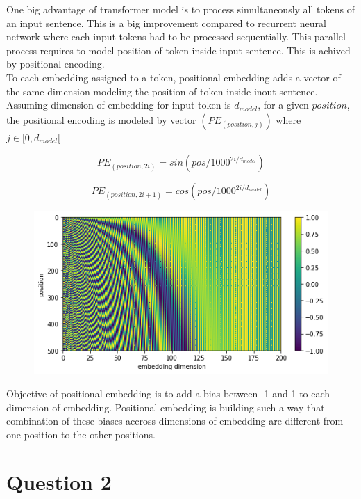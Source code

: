 \documentclass[a4paper]{article}
\begin{document}
One big advantage of transformer model is to process simultaneously all tokens of an input sentence. This is a big improvement compared to recurrent neural network where each input tokens had to be processed sequentially. This parallel process requires to model position of token inside input sentence. This is achived by positional encoding.\\
To each embedding assigned to a token, positional embedding adds a vector of the same dimension modeling the position of token inside inout sentence. Assuming dimension of embedding for input token is $d_{model}$, for a given $position$, the positional encoding is modeled by vector $(PE_{(position,j)})$  where $j \in [0,d_{model}[$

\begin{equation}
PE_{(position,2i)}=sin(pos/1000^{2i/d_{model}})
\end{equation}

\begin{equation}
PE_{(position,2i+1)}=cos(pos/1000^{2i/d_{model}})
\end{equation}

\begin{figure}[H]
\centering
\includegraphics[scale=1.0]{figures/pos encoding.png}
\end{figure}

Objective of positional embedding is to add a bias between -1 and 1 to each dimension of embedding. Positional embedding is building such a way that combination of these biases accross dimensions of embedding are different from one position to the other positions.


\section{Question 2}
\end{document}
